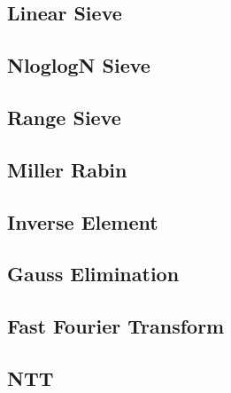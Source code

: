 \documentclass[a4paper,10pt,twocolumn,oneside]{article}
\begin{document}
\subsection{Linear Sieve}


\subsection{NloglogN Sieve}


\subsection{Range Sieve}


\subsection{Miller Rabin}


\subsection{Inverse Element}


\subsection{Gauss Elimination}


\subsection{Fast Fourier Transform}


%

%

\subsection{NTT}

\end{document}
